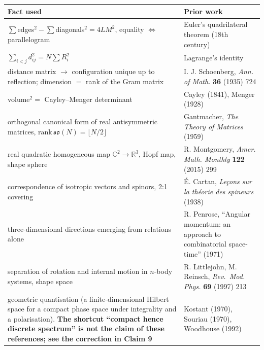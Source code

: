 \documentclass[
  10pt,
]{article}
\newcounter{none} %
\begin{document}
{\def\LTcaptype{none} %
\begin{longtable}[]{@{}
  >{\raggedright\arraybackslash}p{}
  >{\raggedright\arraybackslash}p{}@{}}
\toprule\noalign{}
\begin{minipage}[b]{\linewidth}\raggedright
Fact used
\end{minipage} & \begin{minipage}[b]{\linewidth}\raggedright
Prior work
\end{minipage} \\
\midrule\noalign{}
\endhead
\bottomrule\noalign{}
\endlastfoot
\(\sum\)edges\(^2 - \sum\)diagonals\(^2 = 4LM^2\), equality \(\iff\)
parallelogram & Euler's quadrilateral theorem (18th century) \\
\(\sum_{i<j}d_{ij}^2 = N\sum R_i^2\) & Lagrange's identity \\
distance matrix \(\to\) configuration unique up to reflection; dimension
\(=\) rank of the Gram matrix & I. J. Schoenberg, \emph{Ann. of Math.}
\textbf{36} (1935) 724 \\
volume\(^2 =\) Cayley--Menger determinant & Cayley (1841), Menger
(1928) \\
orthogonal canonical form of real antisymmetric matrices,
\(\mathrm{rank}\,\mathfrak{so}(N) = \lfloor N/2\rfloor\) & Gantmacher,
\emph{The Theory of Matrices} (1959) \\
real quadratic homogeneous map \(\mathbb{C}^2\to\mathbb{R}^3\), Hopf
map, shape sphere & R. Montgomery, \emph{Amer. Math. Monthly}
\textbf{122} (2015) 299 \\
correspondence of isotropic vectors and spinors, 2:1 covering & É.
Cartan, \emph{Leçons sur la théorie des spineurs} (1938) \\
three-dimensional directions emerging from relations alone & R. Penrose,
``Angular momentum: an approach to combinatorial space-time'' (1971) \\
separation of rotation and internal motion in \(n\)-body systems, shape
space & R. Littlejohn, M. Reinsch, \emph{Rev.~Mod. Phys.} \textbf{69}
(1997) 213 \\
geometric quantisation (a finite-dimensional Hilbert space for a compact
phase space under integrality and a polarisation). \textbf{The shortcut
``compact hence discrete spectrum'' is not the claim of these
references; see the correction in Claim 9} & Kostant (1970), Souriau
(1970), Woodhouse (1992) \\
\end{longtable}
}
\end{document}
